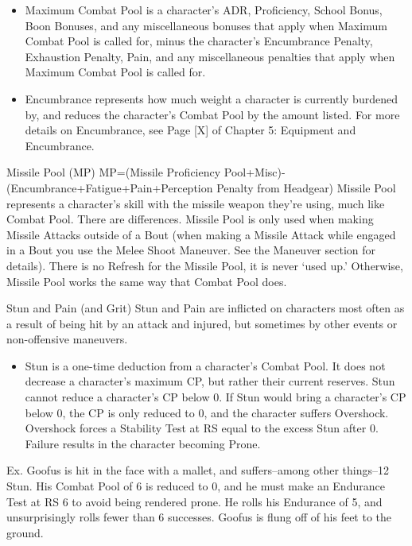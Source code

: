 \documentclass[oneside,11pt,english]{book}
\begin{document}
 
\begin{itemize}
\item Maximum Combat Pool is a character's ADR, Proficiency, School Bonus, Boon Bonuses, and 
any miscellaneous bonuses that apply when Maximum Combat Pool is called for, minus the 
character's Encumbrance Penalty, Exhaustion Penalty, Pain, and any miscellaneous penalties that 
apply when Maximum Combat Pool is called for. 
\item Encumbrance represents how much weight a character is currently burdened by, and reduces 
the character's Combat Pool by the amount listed. For more details on Encumbrance, see Page 
[X] of Chapter 5: Equipment and Encumbrance. 
\end{itemize}


Missile Pool (MP) 
MP=(Missile Proficiency Pool+Misc)-(Encumbrance+Fatigue+Pain+Perception Penalty from Headgear) 
Missile Pool represents a character’s skill with the missile weapon they’re using, much like Combat Pool. 
There are differences. Missile Pool is only used when making Missile Attacks outside of a Bout (when 
making a Missile Attack while engaged in a Bout you use the Melee Shoot Maneuver. See the Maneuver 
section for details). There is no Refresh for the Missile Pool, it is never ‘used up.’ Otherwise, Missile 
Pool works the same way that Combat Pool does. 

 

Stun and Pain (and Grit) 
Stun and Pain are inflicted on characters most often as a result of being hit by an attack and injured, but 
sometimes by other events or non-offensive maneuvers. 

 
\begin{itemize}
\item Stun is a one-time deduction from a character's Combat Pool. It does not decrease a character's 
maximum CP, but rather their current reserves. Stun cannot reduce a character's CP below 0. If 
Stun would bring a character's CP below 0, the CP is only reduced to 0, and the character suffers 
Overshock. Overshock forces a Stability Test at RS equal to the excess Stun after 0. Failure 
results in the character becoming Prone. 
\end{itemize}
 

Ex. Goofus is hit in the face with a mallet, and suffers--among other things--12 Stun. His Combat 
Pool of 6 is reduced to 0, and he must make an Endurance Test at RS 6 to avoid being rendered 
prone. He rolls his Endurance of 5, and unsurprisingly rolls fewer than 6 successes. Goofus is 
flung off of his feet to the ground. 
\end{document}
